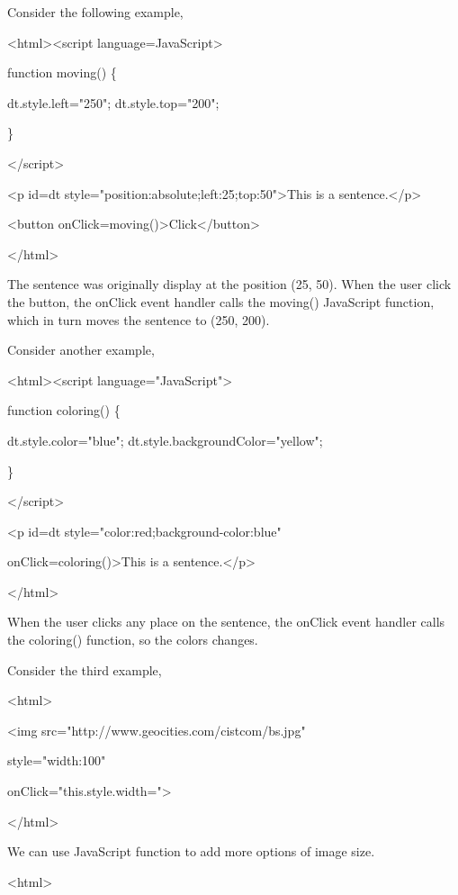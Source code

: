 \documentclass[
]{article}
\begin{document}
Consider the following example,

\textless html\textgreater\textless script
language=JavaScript\textgreater{}

function moving() \{

dt.style.left="250"; dt.style.top="200";

\}

\textless/script\textgreater{}

\textless p id=dt
style="position:absolute;left:25;top:50"\textgreater This is a
sentence.\textless/p\textgreater{}

\textless button
onClick=moving()\textgreater Click\textless/button\textgreater{}

\textless/html\textgreater{}

The sentence was originally display at the position (25, 50). When the
user click the button, the onClick event handler calls the moving()
JavaScript function, which in turn moves the sentence to (250, 200).

Consider another example,

\textless html\textgreater\textless script
language="JavaScript"\textgreater{}

function coloring() \{

dt.style.color="blue"; dt.style.backgroundColor="yellow";

\}

\textless/script\textgreater{}

\textless p id=dt style="color:red;background-color:blue"

onClick=coloring()\textgreater This is a
sentence.\textless/p\textgreater{}

\textless/html\textgreater{}

When the user clicks any place on the sentence, the onClick event
handler calls the coloring() function, so the colors changes.

Consider the third example,

\textless html\textgreater{}

\textless img src="http://www.geocities.com/cistcom/bs.jpg"

style="width:100"

onClick="this.style.width=\textquotesingle"\textgreater{}

\textless/html\textgreater{}

We can use JavaScript function to add more options of image size.

\textless html\textgreater{}
\end{document}

